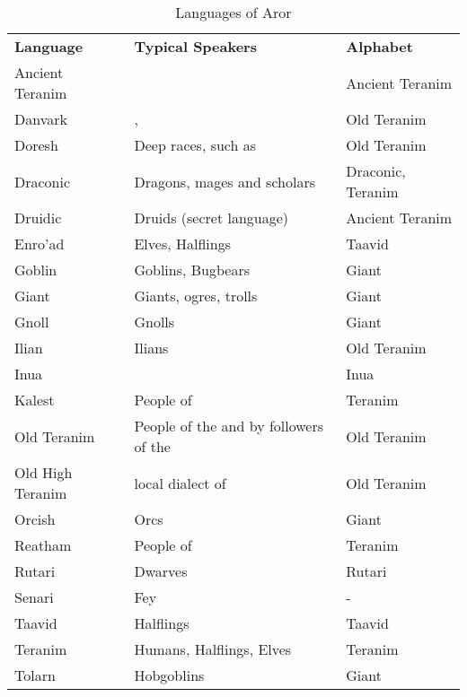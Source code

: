 \begin{table*}[!htb]
  \small
  \caption{Languages of Aror} \label{tbl:Languages}
  \begin{tabular}{l p{8cm} l}
    \textbf{Language} & \textbf{Typical Speakers} & \textbf{Alphabet} \\
    Ancient Teranim & \nameref{sec:Tynrikke}      & Ancient Teranim \\
    Danvark         & \nameref{sec:Morkan}, \nameref{sec:Norbury} & Old Teranim \\
    Doresh          & Deep races, such as \nameref{sec:Deepkin} & Old Teranim \\
    Draconic        & Dragons, mages and scholars & Draconic, Teranim \\
    Druidic         & Druids (secret language)    & Ancient Teranim \\
    Enro'ad         & Elves, Halflings            & Taavid \\
    Goblin          & Goblins, Bugbears           & Giant \\
    Giant           & Giants, ogres, trolls       & Giant \\
    Gnoll           & Gnolls                      & Giant \\
    Ilian           & Ilians                      & Old Teranim \\
    Inua            & \nameref{sec:Inua}          & Inua \\
    Kalest          & People of \nameref{sec:Arania} & Teranim \\
    Old Teranim     & People of the \nameref{sec:Dirgewood} and by followers of the \nameref{sec:Old Ways} & Old Teranim \\
    Old High Teranim& local dialect of\nameref{sec:Tredegar} & Old Teranim \\
    Orcish          & Orcs                        & Giant \\
    Reatham         & People of \nameref{sec:Forsby} & Teranim \\
    Rutari          & Dwarves                     & Rutari \\
    Senari          & Fey                         & - \\
    Taavid          & Halflings                   & Taavid \\
    Teranim         & Humans, Halflings, Elves    & Teranim \\
    Tolarn          & Hobgoblins                  & Giant \\
  \end{tabular}
\end{table*}

